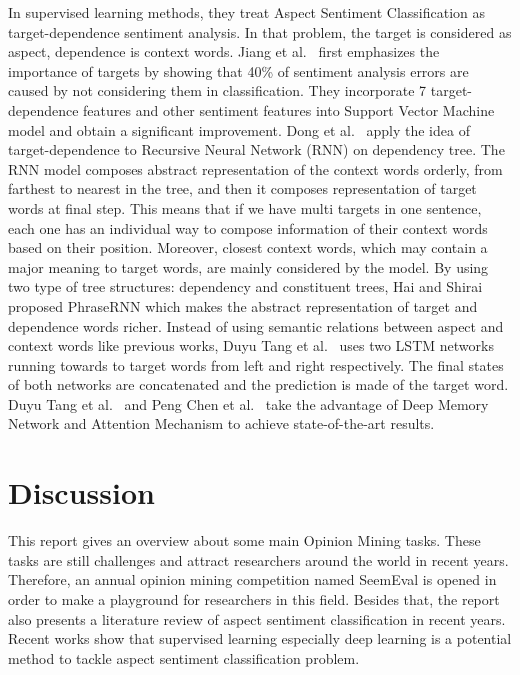 \documentclass{article}
\begin{document}
In supervised learning methods, they treat Aspect Sentiment Classification as target-dependence sentiment analysis.
In that problem, the target is considered as aspect, dependence is context words.
Jiang et al.~\cite{Jiang:2011:TTS:2002472.2002492} first emphasizes the importance of targets by showing that 40\% of sentiment analysis errors are caused by not considering them in classification.
They incorporate 7 target-dependence features and other sentiment features into Support Vector Machine model and obtain a significant improvement.
Dong et al.~\cite{dong2014adaptive} apply the idea of target-dependence to Recursive Neural Network (RNN) on dependency tree.
The RNN model composes abstract representation of the context words orderly, from farthest to nearest in the tree, and then it composes representation of target words at final step.
This means that if we have multi targets in one sentence, each one has an individual way to compose information of their context words based on their position. 
Moreover, closest context words, which may contain a major meaning to target words, are mainly considered by the model.
By using two type of tree structures: dependency and constituent trees, Hai and Shirai~\cite{DBLP:conf/emnlp/NguyenS15} proposed PhraseRNN which makes the abstract representation of target and dependence words richer.
Instead of using semantic relations between aspect and context words like previous works, Duyu Tang et al.~\cite{DBLP:journals/corr/TangQFL15} uses two LSTM networks running towards to target words from left and right respectively. 
The final states of both networks are concatenated and the prediction is made of the target word.
Duyu Tang et al.~\cite{DBLP:journals/corr/TangQL16} and Peng Chen et al.~\cite{D17-1048} take the advantage of Deep Memory Network and Attention Mechanism to achieve state-of-the-art results.

\section{Discussion}
\label{sec:disc}
This report gives an overview about some main Opinion Mining tasks.
These tasks are still challenges and attract researchers around the world in recent years.
Therefore, an annual opinion mining competition named SeemEval is opened in order to make a playground for researchers in this field.
Besides that, the report also presents a literature review of aspect sentiment classification in recent years.
Recent works show that supervised learning especially deep learning is a potential method to tackle aspect sentiment classification problem.




\printbibliography

\end{document}
